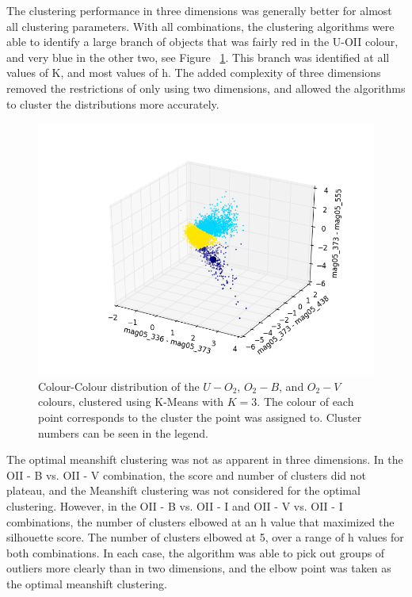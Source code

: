 The clustering performance in three dimensions was generally better for almost all clustering parameters.
With all combinations, the clustering algorithms were able to identify a large branch of objects that was fairly red in the U-OII colour, and very blue in the other two, see Figure ~\ref{fig:UOIIKM3d}.
This branch was identified at all values of K, and most values of h.
The added complexity of three dimensions removed the restrictions of only using two dimensions, and allowed the algorithms to cluster the distributions more accurately.

\begin{figure}
\centering
\includegraphics[width=\linewidth]{figs/kmeans_3d_color_3cl_mag05_336-mag05_373vsmag05_373-mag05_438vsmag05_373-mag05_555}
\caption{Colour-Colour distribution of the $U-O_{2}$, $O_{2}-B$, and $O_{2}-V$ colours, clustered using K-Means with $K=3$. The colour of each point corresponds to the cluster the point was assigned to. Cluster numbers can be seen in the legend.}
\label{fig:UOIIKM3d}
\end{figure}

The optimal meanshift clustering was not as apparent in three dimensions.
In the OII - B vs. OII - V combination, the score and number of clusters did not plateau, and the Meanshift clustering was not considered for the optimal clustering.
However, in the OII - B vs. OII - I and OII - V vs. OII - I combinations, the number of clusters elbowed at an h value that maximized the silhouette score.
The number of clusters elbowed at 5, over a range of h values for both combinations.
In each case, the algorithm was able to pick out groups of outliers more clearly than in two dimensions, and the elbow point was taken as the optimal meanshift clustering.

